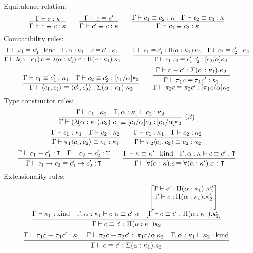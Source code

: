 \begin{judgment}\mbox{}\\
Equivalence relation:
  \[
    \infer{\Gamma \vdash c \equiv c : \kappa}{\Gamma \vdash c : \kappa}
    \qquad
    \infer{\Gamma \vdash c' \equiv c : \kappa}{\Gamma \vdash c \equiv c'}
    \qquad
    \infer{\Gamma \vdash c_1 \equiv c_3 : \kappa}
      {\Gamma \vdash c_1 \equiv c_2 : \kappa
      &\Gamma \vdash c_2 \equiv c_3 : \kappa
      }
  \]
Compatibility rules:
  \[
    \infer{\Gamma \vdash \lambda(\alpha : \kappa_1).c \equiv \lambda(\alpha : \kappa_1').c'
      : \Pi(\alpha : \kappa_1).\kappa_2}
      {\Gamma \vdash \kappa_1 \equiv \kappa_1' : \kind
      &\Gamma, \alpha : \kappa_1 \vdash c \equiv c' : \kappa_2
      }
    \qquad
    \infer{\Gamma \vdash c_1~c_2 \equiv c_1'~c_2' : [c_2/\alpha]\kappa_2}
      {\Gamma \vdash c_1 \equiv c_1' : \Pi(\alpha : \kappa_1).\kappa_2
      &\Gamma \vdash c_2 \equiv c_2' : \kappa_2
      }
  \]
  \[
    \infer{\Gamma \vdash \langle c_1, c_2 \rangle \equiv \langle c_1', c_2' \rangle
      : \Sigma(\alpha : \kappa_1).\kappa_2}
      {\Gamma \vdash c_1 \equiv c_1' : \kappa_1
      &\Gamma \vdash c_2 \equiv c_2' : [c_1 / \alpha]\kappa_2
      }
    \qquad
    \infer{
      \deduce
         {\Gamma \vdash \pi_2c \equiv \pi_2 c' : [\pi_1c/\alpha]\kappa_2}
         {\Gamma \vdash \pi_1c \equiv \pi_1 c' : \kappa_1}
      }
      {\Gamma \vdash c \equiv c' : \Sigma(\alpha : \kappa_1).\kappa_2}
  \]
  Type constructor rules:
  \[
    \infer[(\beta)]
      {\Gamma \vdash (\lambda (\alpha : \kappa_1). c_2)~c_1 \equiv
        [c_1/\alpha]c_2 : [c_1/\alpha]\kappa_2}
      {\Gamma \vdash c_1 : \kappa_1
      &\Gamma, \alpha : \kappa_1 \vdash c_2 : \kappa_2
      }
  \]
  \[
    \infer{\Gamma \vdash \pi_1\langle c_1, c_2 \rangle \equiv c_1 : \kappa_1}
      {\Gamma \vdash c_1 : \kappa_1
      &\Gamma \vdash c_2 : \kappa_2
      }
    \qquad
    \infer{\Gamma \vdash \pi_2\langle c_1, c_2 \rangle \equiv c_2 : \kappa_2}
      {\Gamma \vdash c_1 : \kappa_1
      &\Gamma \vdash c_2 : \kappa_2
      }
  \]
  \[
    \infer{\Gamma \vdash c_1 \to c_2 \equiv c_1' \to c_2' : \T}
      {\Gamma \vdash c_1 \equiv c_1' : \T
      &\Gamma \vdash c_2 \equiv c_2' : \T
      }
    \qquad
    \infer{\Gamma \vdash \forall (\alpha : \kappa).c \equiv \forall(\alpha : \kappa').c' : \T}
      {\Gamma \vdash \kappa \equiv \kappa' : \kind
      &\Gamma, \alpha : \kappa \vdash c \equiv c' : \T
      }
  \]
Extensionality rules:
\[
  \infer{\Gamma \vdash c \equiv c' : \Pi(\alpha : \kappa_1) \kappa_2}
    {\Gamma \vdash \kappa_1 : \kind
    &\Gamma, \alpha : \kappa_1 \vdash c~\alpha \equiv c'~\alpha
    &\deduce{\left[ \Gamma \vdash c \equiv c' : \Pi(\alpha : \kappa_1).\kappa_2' \right]}
      {
        \left[\deduce{\Gamma \vdash c : \Pi(\alpha : \kappa_1).\kappa_2'}
              {\Gamma \vdash c' : \Pi(\alpha : \kappa_1).\kappa_2''}\right]
      }
    }
\]
\[
  \infer{\Gamma \vdash c \equiv c' : \Sigma(\alpha : \kappa_1).\kappa_2}
    {\Gamma \vdash \pi_1c \equiv \pi_1c' : \kappa_1
    &\Gamma \vdash \pi_2c \equiv \pi_2c' : [\pi_1c/\alpha]\kappa_2
    &\Gamma, \alpha : \kappa_1 \vdash \kappa_2 : \kind
    }
\]
\end{judgment}
